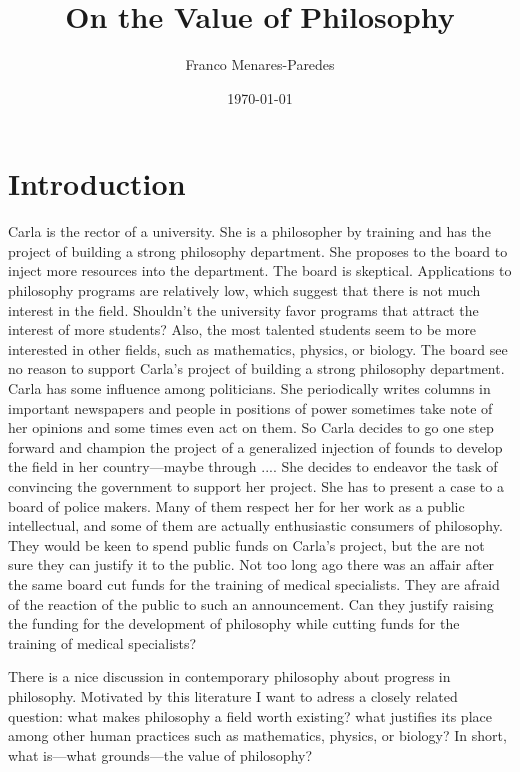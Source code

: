 \documentclass[12pt]{article}
\title{On the Value of Philosophy}
\author{Franco Menares-Paredes}
\date{\today}
\begin{document}
\maketitle

\section{Introduction}

Carla is the rector of a university. She is a philosopher by training and has the project of building a strong philosophy department. She proposes to the board to inject more resources into the department. The board is skeptical. Applications to philosophy programs are relatively low, which suggest that there is not much interest in the field. Shouldn't the university favor programs that attract the interest of more students? Also, the most talented students seem to be more interested in other fields, such as mathematics, physics, or biology. The board see no reason to support Carla's project of building a strong philosophy department. Carla has some influence among politicians. She periodically writes columns in important newspapers and people in positions of power sometimes take note of her opinions and some times even act on them. So Carla decides to go one step forward and champion the project of a generalized injection of founds to develop the field in her country—maybe through .... She decides to endeavor the task of convincing the government to support her project. She has to present a case to a board of police makers. Many of them respect her for her work as a public intellectual, and some of them are actually enthusiastic consumers of philosophy. They would be keen to spend public funds on Carla's project, but the are not sure they can justify it to the public. Not too long ago there was an affair after the same board cut funds for the training of medical specialists. They are afraid of the reaction of the public to such an announcement. Can they justify raising the funding for the development of philosophy while cutting funds for the training of medical specialists? 

There is a nice discussion in contemporary philosophy about progress in philosophy. Motivated by this literature I want to adress a closely related question: what makes philosophy a field worth existing? what justifies its place among other human practices such as mathematics, physics, or biology? In short, what is—what grounds—the value of philosophy?



\newpage


\end{document}

